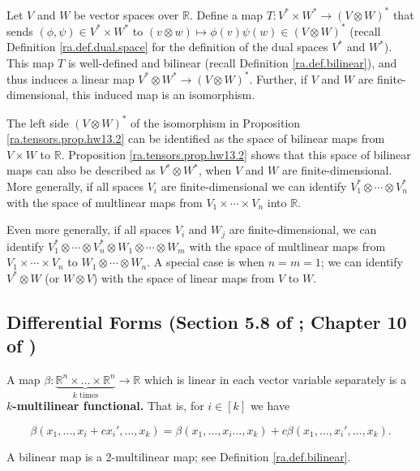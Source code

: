 \begin{proposition}\label{ra.tensors.prop.hw13.2}

Let \(V\) and \(W\) be vector spaces over \(\mathbb{R}\). Define a map \(T: V^* \times W^* \to (V \otimes W)^*\) that sends \((\phi, \psi) \in V^* \times W^*\) to \((v \otimes w) \mapsto \phi(v) \psi(w) \in (V \otimes W)^*\) (recall Definition \ref{ra.def.dual.space} for the definition of the dual spaces \(V^*\) and \(W^*\)). This map \(T\) is well-defined and bilinear (recall Definition \ref{ra.def.bilinear}), and thus induces a linear map \(V^* \otimes W^* \to (V \otimes W)^*\). Further, if \(V\) and \(W\) are finite-dimensional, this induced map is an isomorphism.

\end{proposition}

\begin{remark}\label{ra.rmk.multilinear.map}

The left side \( (V \otimes W)^*\) of the isomorphism in Proposition \ref{ra.tensors.prop.hw13.2} can be identified as the space of bilinear maps from \(V \times W\) to \(\mathbb{R}\). Proposition \ref{ra.tensors.prop.hw13.2} shows that this space of bilinear maps can also be described as \(V^* \otimes W^*\), when \(V\) and \(W\) are finite-dimensional. More generally, if all spaces \(V_i\) are finite-dimensional we can identify \(V_1^* \otimes \cdots \otimes V_n^*\) with the space of multlinear maps from \(V_1 \times \cdots \times V_n\) into \(\mathbb{R}\).

Even more generally, if all spaces \(V_i\) and \(W_j\) are finite-dimensional, we can identify \(V_1^* \otimes \cdots \otimes V_n^* \otimes W_1 \otimes \cdots \otimes W_m\) with the space of multlinear maps from \(V_1 \times \cdots \times V_n\) to \(W_1 \otimes \cdots \otimes W_n\). A special case is when \(n=m=1\); we can identify \(V^* \otimes W\) (or \(W \otimes V\)) with the space of linear maps from \(V\) to \(W\). 

\end{remark}

\subsection{Differential Forms (Section 5.8 of \citet{pugh2015real}; Chapter 10 of \citet{rudin1976principles})}\label{ra.5.8.pugh}

\begin{definition}\label{ra.def.multilinear}

A map \(\beta:  \underbrace{\mathbb{R}^n \times \ldots \times \mathbb{R}^n}_{k \text{ times}} \to \mathbb{R}\) which is linear in each vector variable separately is a \textbf{\(k\)-multilinear functional.} That is, for \(i \in [k]\) we have

\[
\beta(x_1, \ldots, x_i + cx_i', \ldots, x_k) = \beta(x_1, \ldots, x_i  \ldots, x_k)  + c \beta(x_1, \ldots, x_i', \ldots, x_k) .
\]

A bilinear map is a 2-multilinear map; see Definition \ref{ra.def.bilinear}.

\end{definition}

